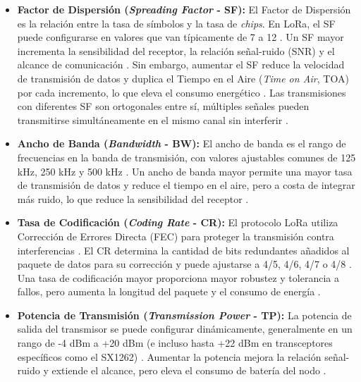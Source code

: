 \begin{itemize}
    \item \textbf{Factor de Dispersión (\textit{Spreading Factor} - SF):} El Factor de Dispersión es la relación entre la tasa de símbolos y la tasa de \textit{chips}. En LoRa, el SF puede configurarse en valores que van típicamente de 7 a 12 \cite{semtech_sx1261, wei2020_comparison}. Un SF mayor incrementa la sensibilidad del receptor, la relación señal-ruido (SNR) y el alcance de comunicación \cite{bor2016_lora}. Sin embargo, aumentar el SF reduce la velocidad de transmisión de datos y duplica el Tiempo en el Aire (\textit{Time on Air}, TOA) por cada incremento, lo que eleva el consumo energético \cite{jebril2018_overcoming}. Las transmisiones con diferentes SF son ortogonales entre sí, múltiples señales pueden transmitirse simultáneamente en el mismo canal sin interferir \cite{bor2016_lora, wei2019_various}.
    
    \item \textbf{Ancho de Banda (\textit{Bandwidth} - BW):} El ancho de banda es el rango de frecuencias en la banda de transmisión, con valores ajustables comunes de 125 kHz, 250 kHz y 500 kHz \cite{semtech_sx1261}. Un ancho de banda mayor permite una mayor tasa de transmisión de datos y reduce el tiempo en el aire, pero a costa de integrar más ruido, lo que reduce la sensibilidad del receptor \cite{jebril2018_overcoming}.
    
    \item \textbf{Tasa de Codificación (\textit{Coding Rate} - CR):} El protocolo LoRa utiliza Corrección de Errores Directa (FEC) para proteger la transmisión contra interferencias \cite{jebril2018_overcoming}. El CR determina la cantidad de bits redundantes añadidos al paquete de datos para su corrección y puede ajustarse a 4/5, 4/6, 4/7 o 4/8 \cite{semtech_sx1261}. Una tasa de codificación mayor proporciona mayor robustez y tolerancia a fallos, pero aumenta la longitud del paquete y el consumo de energía \cite{jebril2018_overcoming}.
    
    \item \textbf{Potencia de Transmisión (\textit{Transmission Power} - TP):} La potencia de salida del transmisor se puede configurar dinámicamente, generalmente en un rango de -4 dBm a +20 dBm (e incluso hasta +22 dBm en transceptores específicos como el SX1262) \cite{semtech_sx1261}. Aumentar la potencia mejora la relación señal-ruido y extiende el alcance, pero eleva el consumo de batería del nodo \cite{wei2020_comparison}.
\end{itemize}


